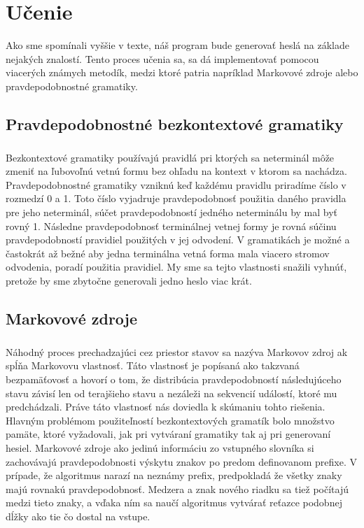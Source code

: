 \chapter{Učenie}
Ako sme spomínali vyššie v texte, náš program bude generovať heslá na základe nejakých znalostí. Tento proces učenia sa, sa dá implementovať pomocou viacerých známych metodík, medzi ktoré patria napríklad Markovové zdroje alebo pravdepodobnostné gramatiky.

\section{Pravdepodobnostné bezkontextové gramatiky}
\paragraph{}
Bezkontextové gramatiky používajú pravidlá pri ktorých sa neterminál môže zmeniť na ľubovoľnú vetnú formu bez ohľadu na kontext v ktorom sa nachádza. Pravdepodobnostné gramatiky vzniknú keď každému pravidlu priradíme číslo v rozmedzí 0 a 1. Toto číslo vyjadruje pravdepodobnosť použitia daného pravidla pre jeho neterminál, súčet pravdepodobností jedného neterminálu by mal byť rovný 1. Následne pravdepodobnosť terminálnej vetnej formy je rovná súčinu pravdepodobností pravidiel použitých v jej odvodení. V gramatikách je možné a častokrát až bežné aby jedna terminálna vetná forma mala viacero stromov odvodenia, poradí použitia pravidiel. My sme sa tejto vlastnosti snažili vyhnúť, pretože by sme zbytočne generovali jedno heslo viac krát.

\section{Markovové zdroje}
\paragraph{}
Náhodný proces prechadzajúci cez priestor stavov sa nazýva Markovov zdroj ak spĺňa Markovovu vlastnosť. Táto vlastnosť je popísaná ako takzvaná bezpamäťovosť a hovorí o tom, že distribúcia pravdepodobností následujúceho stavu závisí len od terajšieho stavu a nezáleži na sekvencií událostí, ktoré mu predchádzali. Práve táto vlastnosť nás doviedla k skúmaniu tohto riešenia. Hlavným problémom použiteľností bezkontextových gramatík bolo množstvo pamäte, ktoré vyžadovali, jak pri vytváraní gramatiky tak aj pri generovaní hesiel. Markovové zdroje ako jedinú informáciu zo vstupného slovníka si zachovávajú pravdepodobnosti výskytu znakov po predom definovanom prefixe. V prípade, že algoritmus narazí na neznámy prefix, predpokladá že všetky znaky majú rovnakú pravdepodobnosť. Medzera a znak nového riadku sa tiež počítajú medzi tieto znaky, a vďaka ním sa naučí algoritmus vytvárať reťazce podobnej dĺžky ako tie čo dostal na vstupe.